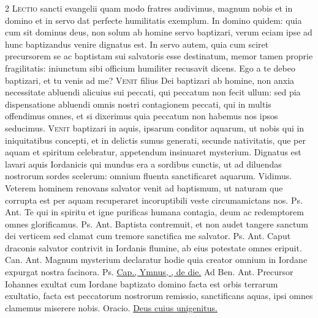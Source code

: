 \begin{multicols*}{2}
\lettrine[lines=2]{\zallmancaps \color{Red} L}{ectio} sancti evangelii quam modo fratres audivimus, magnum nobis et in domino et in servo dat perfecte humilitatis exemplum. In domino quidem: quia cum sit dominus deus, non solum ab homine servo baptizari, verum eciam ipse ad hunc baptizandus venire dignatus est. In servo autem, quia cum sciret precursorem se ac baptistam sui salvatoris esse destinatum, memor tamen proprie fragilitatis: iniunctum sibi officium humiliter recusavit dicens. Ego a te debeo baptizari, et tu venis ad me?
\lettrine[lines=2]{\zallmancaps \color{Blue} V}{enit} filius Dei baptizari ab homine, non anxia necessitate abluendi alicuius sui peccati, qui peccatum non fecit ullum: sed pia dispensatione abluendi omnis nostri contagionem peccati, qui in multis offendimus omnes, et si dixerimus quia peccatum non habemus nos ipsos seducimus.
\lettrine[lines=2]{\zallmancaps \color{Red} V}{enit} baptizari in aquis, ipsarum conditor aquarum, ut nobis qui in iniquitatibus concepti, et in delictis sumus generati, secunde nativitatis, que per aquam et spiritum celebratur, appetendum insinuaret mysterium. Dignatus est lavari
aquis Iordanicis qui mundus era a sordibus cunctis, ut ad diluendas nostrorum sordes scelerum: omnium fluenta sanctificaret aquarum.
\V Vidimus.
 Veterem hominem renovans salvator venit ad baptismum, ut naturam que corrupta est per aquam recuperaret incoruptibili veste circumamictans nos. {\color{Red} Ps.}  {\color{Red} Ant.} Te qui in spiritu et igne purificas humana contagia, deum ac redemptorem omnes glorificamus. {\color{Red} Ps.}  {\color{Red} Ant.} Baptista contremuit, et non audet tangere sanctum dei verticem sed clamat cum tremore sanctifica me salvator. {\color{Red} Ps.}  {\color{Red} Ant.} Caput draconis salvator contrivit in Iordanis flumine, ab eius potestate omnes eripuit. {\color{Red} Can.}  {\color{Red} Ant.} Magnum mysterium declaratur hodie quia creator omnium in Iordane expurgat nostra facinora. {\color{Red} Ps.}  \ul{Cap., Ymnus, \Vbar , de die.} {\color{Red} Ad Ben. Ant.} Precursor Iohannes exultat cum Iordane baptizato domino facta est orbis terrarum exultatio, facta est peccatorum nostrorum remissio, sanctificans aquas, ipsi omnes clamemus miserere nobis. {\color{Red} Oracio.} \hyperlink{deus-cuius-unigenitus-epiphanie}{Deus cuius unigenitus.}

\end{multicols*}
